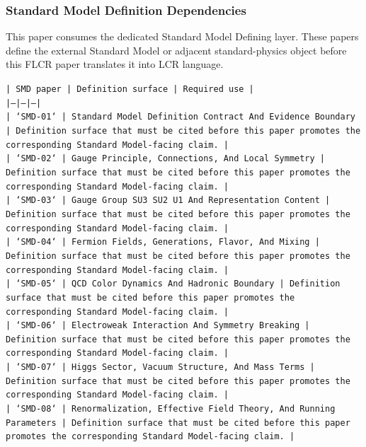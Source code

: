 \documentclass[11pt]{article}
\begin{document}
\subsubsection*{Standard Model Definition Dependencies}

This paper consumes the dedicated Standard Model Defining layer. These papers define the external Standard Model or adjacent standard-physics object before this FLCR paper translates it into LCR language.

\noindent\texttt{| SMD paper | Definition surface | Required use |}\\
\noindent\texttt{|---|---|---|}\\
\noindent\texttt{| `SMD-01` | Standard Model Definition Contract And Evidence Boundary | Definition surface that must be cited before this paper promotes the corresponding Standard Model-facing claim. |}\\
\noindent\texttt{| `SMD-02` | Gauge Principle, Connections, And Local Symmetry | Definition surface that must be cited before this paper promotes the corresponding Standard Model-facing claim. |}\\
\noindent\texttt{| `SMD-03` | Gauge Group SU3 SU2 U1 And Representation Content | Definition surface that must be cited before this paper promotes the corresponding Standard Model-facing claim. |}\\
\noindent\texttt{| `SMD-04` | Fermion Fields, Generations, Flavor, And Mixing | Definition surface that must be cited before this paper promotes the corresponding Standard Model-facing claim. |}\\
\noindent\texttt{| `SMD-05` | QCD Color Dynamics And Hadronic Boundary | Definition surface that must be cited before this paper promotes the corresponding Standard Model-facing claim. |}\\
\noindent\texttt{| `SMD-06` | Electroweak Interaction And Symmetry Breaking | Definition surface that must be cited before this paper promotes the corresponding Standard Model-facing claim. |}\\
\noindent\texttt{| `SMD-07` | Higgs Sector, Vacuum Structure, And Mass Terms | Definition surface that must be cited before this paper promotes the corresponding Standard Model-facing claim. |}\\
\noindent\texttt{| `SMD-08` | Renormalization, Effective Field Theory, And Running Parameters | Definition surface that must be cited before this paper promotes the corresponding Standard Model-facing claim. |}\\
\end{document}
